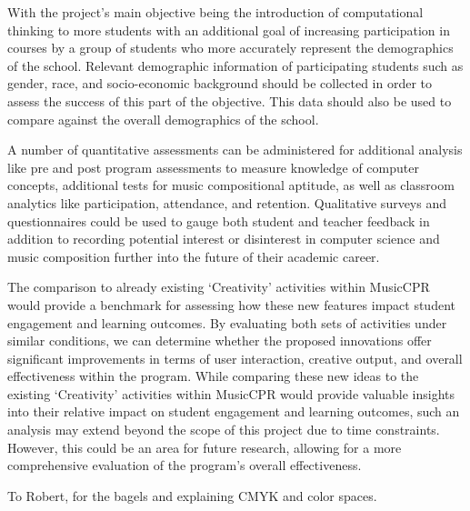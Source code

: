 \documentclass[manuscript,screen,review]{acmart}
\begin{document}




With the project's main objective being the introduction of computational thinking to more students with an additional goal of increasing participation in courses by a group of students who more accurately represent the demographics of the school. Relevant demographic information of participating students such as gender, race, and socio-economic background should be collected in order to assess the success of this part of the objective. This data should also be used to compare against the overall demographics of the school. 

A number of quantitative assessments can be administered for additional analysis like pre and post program assessments to measure knowledge of computer concepts, additional tests for music compositional aptitude, as well as classroom analytics like participation, attendance, and retention. Qualitative surveys and questionnaires could be used to gauge both student and teacher feedback in addition to recording potential interest or disinterest in computer science and music composition further into the future of their academic career. 

The comparison to already existing `Creativity' activities within MusicCPR would provide a benchmark for assessing how these new features impact student engagement and learning outcomes. By evaluating both sets of activities under similar conditions, we can determine whether the proposed innovations offer significant improvements in terms of user interaction, creative output, and overall effectiveness within the program. While comparing these new ideas to the existing `Creativity' activities within MusicCPR would provide valuable insights into their relative impact on student engagement and learning outcomes, such an analysis may extend beyond the scope of this project due to time constraints. However, this could be an area for future research, allowing for a more comprehensive evaluation of the program's overall effectiveness.

\begin{acks}
To Robert, for the bagels and explaining CMYK and color spaces.
\end{acks}




\appendix
\end{document}
